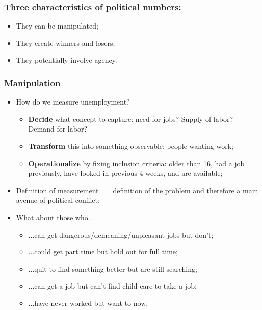 \documentclass[aspectratio=169]{beamer}
\theoremstyle{principle}
\begin{document}
\begin{frame}
\frametitle{Three characteristics of political numbers:}
\begin{itemize}
\item They can be manipulated;
\bigskip
\bigskip
\bigskip
\item They create winners and losers;
\bigskip
\bigskip
\bigskip
\item They potentially involve agency.
\end{itemize}

\end{frame}


\begin{frame}
\frametitle{Manipulation}
\begin{itemize}
\item How do we measure unemployment?
\begin{itemize}
\item \textbf{Decide} what concept to capture: need for jobs?  Supply of labor?  Demand for labor?
\item \textbf{Transform} this into something observable: people wanting work;
\item \textbf{Operationalize} by fixing inclusion criteria: older than 16, had a job previously, have looked in previous 4 weeks, and are available;
\end{itemize}
\bigskip
\bigskip
\item Definition of measurement $=$ definition of the problem and therefore a main avenue of political conflict;
\bigskip
\bigskip
\item What about those who...
\begin{itemize}
\item ...can get dangerous/demeaning/unpleasant jobs but don't;
\item ...could get part time but hold out for full time;
\item ...quit to find something better but are still searching;
\item ...can get a job but can't find child care to take a job;
\item ...have never worked but want to now.
\end{itemize}

\end{itemize}
\end{frame}
\end{document}
